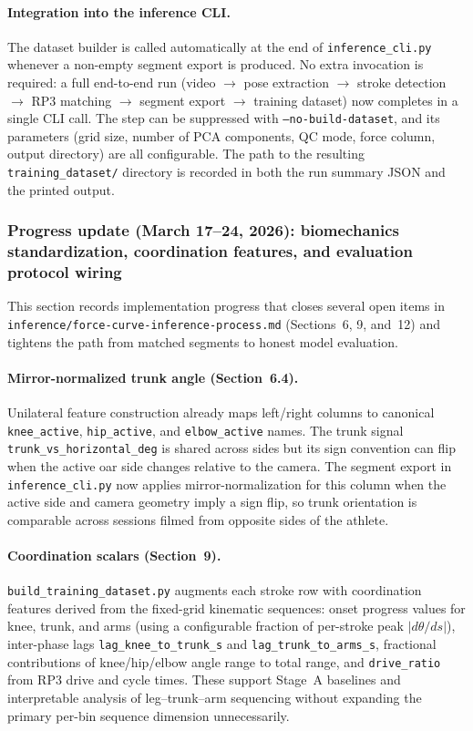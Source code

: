 \documentclass[11pt]{article}
\begin{document}
\paragraph{Integration into the inference CLI.}
The dataset builder is called automatically at the end of \texttt{inference\_cli.py} whenever a non-empty segment export is produced. No extra invocation is required: a full end-to-end run (video $\rightarrow$ pose extraction $\rightarrow$ stroke detection $\rightarrow$ RP3 matching $\rightarrow$ segment export $\rightarrow$ training dataset) now completes in a single CLI call. The step can be suppressed with \texttt{--no-build-dataset}, and its parameters (grid size, number of PCA components, QC mode, force column, output directory) are all configurable. The path to the resulting \texttt{training\_dataset/} directory is recorded in both the run summary JSON and the printed output.

\subsubsection*{Progress update (March 17--24, 2026): biomechanics standardization, coordination features, and evaluation protocol wiring}

This section records implementation progress that closes several open items in \texttt{inference/force-curve-inference-process.md} (Sections~6, 9, and~12) and tightens the path from matched segments to honest model evaluation.

\paragraph{Mirror-normalized trunk angle (Section~6.4).}
Unilateral feature construction already maps left/right columns to canonical \texttt{knee\_active}, \texttt{hip\_active}, and \texttt{elbow\_active} names. The trunk signal \texttt{trunk\_vs\_horizontal\_deg} is shared across sides but its sign convention can flip when the active oar side changes relative to the camera. The segment export in \texttt{inference\_cli.py} now applies mirror-normalization for this column when the active side and camera geometry imply a sign flip, so trunk orientation is comparable across sessions filmed from opposite sides of the athlete.

\paragraph{Coordination scalars (Section~9).}
\texttt{build\_training\_dataset.py} augments each stroke row with coordination features derived from the fixed-grid kinematic sequences: onset progress values for knee, trunk, and arms (using a configurable fraction of per-stroke peak $|d\theta/ds|$), inter-phase lags \texttt{lag\_knee\_to\_trunk\_s} and \texttt{lag\_trunk\_to\_arms\_s}, fractional contributions of knee/hip/elbow angle range to total range, and \texttt{drive\_ratio} from RP3 drive and cycle times. These support Stage~A baselines and interpretable analysis of leg--trunk--arm sequencing without expanding the primary per-bin sequence dimension unnecessarily.
\end{document}
